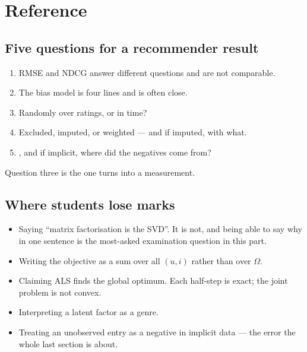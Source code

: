 \documentclass[11pt,a4paper]{article}
\begin{document}
\section{Reference}

\subsection{Five questions for a recommender result}

\begin{enumerate}[leftmargin=*]
  \item {} RMSE and NDCG answer different
        questions and are not comparable.
  \item {} The bias model is four lines and is often
        close.
  \item {} Randomly over ratings, or in time?
  \item {} Excluded, imputed, or
        weighted --- and if imputed, with what.
  \item {}, and if implicit, where did the negatives
        come from?
\end{enumerate}

Question three is the one  turns into a measurement.

\subsection{Where students lose marks}

\begin{itemize}[leftmargin=*,nosep]
  \item Saying ``matrix factorisation is the SVD''. It is not, and being able
        to say why in one sentence is the most-asked examination question in
        this part.
  \item Writing the objective as a sum over all $(u,i)$ rather than over
        $\Omega$.
  \item Claiming ALS finds the global optimum. Each half-step is exact; the
        joint problem is not convex.
  \item Interpreting a latent factor as a genre.
  \item Treating an unobserved entry as a negative in implicit data --- the
        error the whole last section is about.
\end{itemize}
\end{document}
